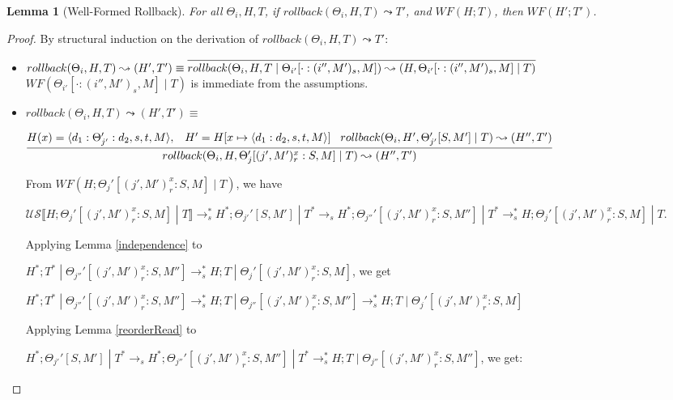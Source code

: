 \documentclass[9pt]{article}
\newtheorem{lemma}{Lemma}
\newcommand\specStep{\rightarrow_{s}}
\newcommand{\unSpec}[1]{\mathcal{US} \llbracket #1 \rrbracket}
\begin{document}
\begin{lemma}[Well-Formed Rollback]
\label{wellFormedRollback}
For all $\Theta_i, H, T$, if $rollback(\Theta_i, H, T) \leadsto T'$, and $WF(H; T)$, then $WF(H'; T')$. 
\end{lemma}

\begin{proof}
By structural induction on the derivation of $rollback(\Theta_i, H, T) \leadsto T'$:

\begin{itemize}
\item $rollback(\Theta_i, H, T) \leadsto (H',T') \equiv \infer[]{rollback(\Theta_i, H, T \; | \; \Theta_{i'}[\cdot : (i'', M')_s, M]) \leadsto (H, \Theta_{i'}[\cdot : (i'', M')_s, M] \; | \; T)}{}$
$WF(\Theta_{i'}[\cdot : (i'', M')_s, M] \; | \; T)$ is immediate from the assumptions. 

\item $rollback(\Theta_i, H, T ) \leadsto (H', T') \equiv$

$ \infer[]{rollback(\Theta_i, H, \Theta_j'[(j', M')_r^x : S, M] \; | \; T) \leadsto (H'', T')}{H(x) = \langle d_1 : \Theta_{j'}' : d_2, s, t, M\rangle, \;\;\; H' = H[x \mapsto \langle d_1 : d_2, s, t, M\rangle] \;\;\; rollback(\Theta_i, H', \Theta_{j'}'[S, M'] \; | \; T) \leadsto (H'', T')}$

From $WF(H; \Theta_j'[(j', M')_r^x : S, M] \; | \; T)$, we have 

$\unSpec{H; \Theta_j'[ (j', M')_r^x : S, M] \; | \; T} \specStep^* H^*; \Theta_{j'}'[S, M'] \; | \; T^* \specStep H^*; \Theta_{j''}'[ (j', M')_r^x : S, M''] \; | \; T^* \specStep^* H; \Theta_j'[(j', M')_r^x : S, M] \; | \; T$.  

Applying Lemma \ref{independence} to 

$H^*; T^* \; | \; \Theta_{j''}'[(j', M')_r^x : S, M'']  \specStep^* H; T \; | \; \Theta_j'[(j', M')_r^x : S, M] $, we get

$H^*; T^* \; | \; \Theta_{j''}'[(j', M')_r^x : S, M'']  \specStep^* H; T \; | \; \Theta_{j''}[ (j', M')_r^x : S, M''] \specStep^* H; T \; | \; \Theta_j'[ (j', M')_r^x : S, M] $

Applying Lemma \ref{reorderRead} to 

$H^*; \Theta_{j'}'[S, M'] \; | \; T^* \specStep H^*; \Theta_{j''}'[(j', M')_r^x : S, M''] \; | \; T^* \specStep^*  H; T \; | \; \Theta_{j''}[ (j', M')_r^x : S, M'']$, we get:


\end{itemize}
\end{proof}
\end{document}
